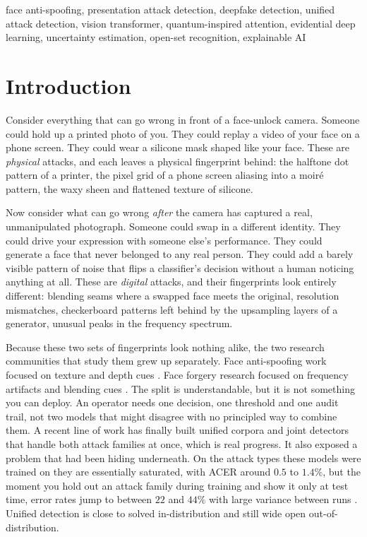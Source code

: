 \documentclass[conference]{IEEEtran}
\begin{document}
\begin{IEEEkeywords}
face anti-spoofing, presentation attack detection, deepfake detection, unified
attack detection, vision transformer, quantum-inspired attention, evidential deep
learning, uncertainty estimation, open-set recognition, explainable AI
\end{IEEEkeywords}

\section{Introduction}
Consider everything that can go wrong in front of a face-unlock camera. Someone
could hold up a printed photo of you. They could replay a video of your face on a
phone screen. They could wear a silicone mask shaped like your face. These are
\emph{physical} attacks, and each leaves a physical fingerprint behind: the halftone
dot pattern of a printer, the pixel grid of a phone screen aliasing into a moir\'e
pattern, the waxy sheen and flattened texture of silicone.

Now consider what can go wrong \emph{after} the camera has captured a real,
unmanipulated photograph. Someone could swap in a different identity. They could
drive your expression with someone else's performance. They could generate a face
that never belonged to any real person. They could add a barely visible pattern of
noise that flips a classifier's decision without a human noticing anything at all.
These are \emph{digital} attacks, and their fingerprints look entirely different:
blending seams where a swapped face meets the original, resolution mismatches,
checkerboard patterns left behind by the upsampling layers of a generator, unusual
peaks in the frequency spectrum.

Because these two sets of fingerprints look nothing alike, the two research
communities that study them grew up separately. Face anti-spoofing work focused on
texture and depth cues \cite{liu2018auxiliary,yu2020cdcn,yu2021revisiting,wang2022ssan}.
Face forgery research focused on frequency artifacts and blending cues
\cite{rossler2019ff,li2020celebdf,frank2020frequency,wang2020cnnspot}. The split is
understandable, but it is not something you can deploy. An operator needs one
decision, one threshold and one audit trail, not two models that might disagree
with no principled way to combine them. A recent line of work
\cite{yu2024unified,yuan2024challenge,ma2025uniattackplus,chen2025uniattack,zhang2024unidefense}
has finally built unified corpora and joint detectors that handle both attack
families at once, which is real progress. It also exposed a problem that had been
hiding underneath. On the attack types these models were trained on they are
essentially saturated, with ACER around $0.5$ to $1.4\%$, but the moment you hold out
an attack family during training and show it only at test time, error rates jump to
between $22$ and $44\%$ with large variance between runs \cite{yu2024unified}.
Unified detection is close to solved in-distribution and still wide open
out-of-distribution.
\end{document}

